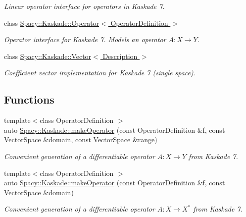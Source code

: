 \begin{DoxyCompactItemize}
\begin{DoxyCompactList}\small\item\em Linear operator interface for operators in Kaskade 7. \end{DoxyCompactList}\item 
class \hyperlink{classSpacy_1_1Kaskade_1_1Operator}{Spacy\+::\+Kaskade\+::\+Operator$<$ Operator\+Definition $>$}
\begin{DoxyCompactList}\small\item\em Operator interface for Kaskade 7. Models an operator $A:X\rightarrow Y$. \end{DoxyCompactList}\item 
class \hyperlink{classSpacy_1_1Kaskade_1_1Vector}{Spacy\+::\+Kaskade\+::\+Vector$<$ Description $>$}
\begin{DoxyCompactList}\small\item\em Coefficient vector implementation for Kaskade 7 (single space). \end{DoxyCompactList}\end{DoxyCompactItemize}
\subsection*{Functions}
\begin{DoxyCompactItemize}
\item 
{\footnotesize template$<$class Operator\+Definition $>$ }\\auto \hyperlink{group__KaskadeGroup_ga0e8d7d2c51e429e22561ef813fc97589}{Spacy\+::\+Kaskade\+::make\+Operator} (const Operator\+Definition \&f, const Vector\+Space \&domain, const Vector\+Space \&range)
\begin{DoxyCompactList}\small\item\em Convenient generation of a differentiable operator $A: X\rightarrow Y$ from Kaskade 7. \end{DoxyCompactList}\item 
{\footnotesize template$<$class Operator\+Definition $>$ }\\auto \hyperlink{group__KaskadeGroup_ga3afbd00437ea7bdb406f3d9a1f375522}{Spacy\+::\+Kaskade\+::make\+Operator} (const Operator\+Definition \&f, const Vector\+Space \&domain)
\begin{DoxyCompactList}\small\item\em Convenient generation of a differentiable operator $A: X\rightarrow X^*$ from Kaskade 7. \end{DoxyCompactList}\end{DoxyCompactItemize}


